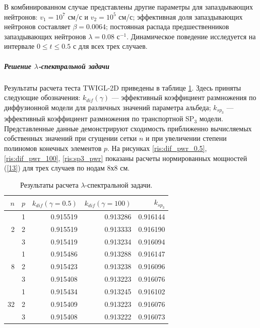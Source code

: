 \documentclass{crm-article}
\begin{document}
В комбинированном случае представлены другие параметры для запаздывающих нейтронов: $v_1 = 10^7$ см/с и $v_2 = 10^5$ см/с; эффективная доля запаздывающих нейтронов составляет $\beta = 0.0064$;  постоянная распада предшественников запаздывающих нейтронов $\lambda = 0.08$ с$^{-1}$. 
Динамическое поведение исследуется на интервале $0 \leq t \leq 0.5$ с для всех трех случаев. 

\subparagraph{Решение $\lambda$-спектральной задачи}
Результаты расчета теста TWIGL-2D приведены в таблице \ref{table:t2-lamda}.
Здесь приняты следующие обозначения: 
$k_{dif}(\gamma)$ --- эффективный коэффициент размножения по диффузионной модели для различных значений параметра альбеда; $k_{sp_3}$ --- эффективный коэффициент размножения по транспортной SP$_3$ модели. 
Представленные данные демонстрируют сходимость приближенно вычисляемых собственных значений при сгущении сетки $n$ и при увеличении степени полиномов конечных элементов $p$.
На рисунках \ref{ris:dif_pwr_0.5}, \ref{ris:dif_pwr_100}, \ref{ris:sp3_pwr} показаны расчеты нормированных мощностей (\ref{13}) для трех случаев по нодам 8х8 см. 

\begin{table}[h]
\caption{Результаты расчета $\lambda$-спектральной задачи.}
\label{table:t2-lamda}
\begin{center}
\begin{tabular}{r r r r r}
\hline
$n$ & $p$ & $k_{dif} (\gamma=0.5)$ & $k_{dif} (\gamma=100)$ & $k_{sp_3}$\\
\hline
	& 1	& 0.915519 & 0.913286 & 0.916144\\
2	& 2	& 0.915519 & 0.913333 & 0.916190\\
	& 3	& 0.915419 & 0.913234 & 0.916094\\ 
\hline
	& 1	& 0.915486 & 0.913288 & 0.916147\\
8& 2	& 0.915423 & 0.913238 & 0.916096\\
	& 3	& 0.915408 & 0.913223 & 0.916076\\ 
\hline
	& 1	& 0.915434 & 0.913245 & 0.916102\\
32& 2	& 0.915409 & 0.913223 & 0.916076\\
	& 3	& 0.915408 & 0.913222 & 0.916073\\
\hline
\end{tabular}
\end{center}
\end{table}
\end{document}
